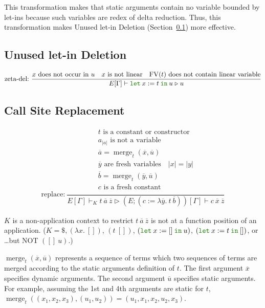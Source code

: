 \documentclass[a4paper,fleqn]{article}
\newcommand{\kwlet}{\mbox{\color{mygreen}\ttfamily let}}
\newcommand{\kwin}{\mbox{\color{mygreen}\ttfamily in}}
\newcommand{\lam}[2]{\lambda #1.\:#2}
\newcommand{\glodefB}[2]{(#1:=#2)}
\newcommand{\letin}[3]{\kwlet\:#1:=#2\:\kwin\:#3}
\DeclareMathOperator{\FV}{FV}
\DeclareMathOperator{\merg}{merge}
\newcommand{\secref}[1]{Section~\ref{#1}}
\newcommand{\reltri}{\mathrel{\triangleright}}
\newcommand{\rep}[1]{\overline{#1}}
\begin{document}
This transformation makes that static arguments contain no variable bounded by let-ins
because such variables are redex of delta reduction.
Thus, this transformation makes Unused let-in Deletion (\secref{sec:let-in-deletion}) more effective.

\subsection{Unused let-in Deletion}\label{sec:let-in-deletion}

\begin{gather*}
  \text{zeta-del:}~
    \dfrac{
      \text{$x$ does not occur in $u$} \quad \text{$x$ is not linear} \quad \text{$\FV(t)$ does not contain linear variable}
    }{E[\Gamma] \vdash \letin{x}{t}{u}
                       \reltri
                       u
    }
\end{gather*}

\subsection{Call Site Replacement}\label{sec:call-site-replacement}

\begin{gather*}
  \text{replace:}~
    \dfrac{
      \begin{gathered}
        \text{$t$ is a constant or constructor} \\
        \text{$a_{|a|}$ is not a variable} \\
        \rep{a} = \merg_t(\rep{x}, \rep{u}) \\
        \text{$\rep{y}$ are fresh variables} \quad
        |x| = |y| \\
        \rep{b} = \merg_t(\rep{y}, \rep{u}) \\
        \text{$c$ is a fresh constant} \\
      \end{gathered}
    }{E[\Gamma] \vdash_K t\:\rep{a}\:\rep{z}
      \reltri
      (E;\glodefB{c}{\lam{\rep{y}}{t\:\rep{b}}})[\Gamma] \vdash c\:\rep{x}\:\rep{z}
    }
\end{gather*}

$K$ is a non-application context to restrict $t\:\rep{a}\:\rep{z}$ is not at a function position of an application.
($K = \$, (\lam{x}{[]})$, $(t\:[])$, $(\letin{x}{[]}{u})$, $(\letin{x}{t}{[]})$, or \ldots but NOT $([]\:u)$.)

$\merg_t(\rep{x}, \rep{u})$ represents a sequence of terms which two sequences of terms are merged according to the static arguments definition of $t$.
The first argument $\rep{x}$ specifies dynamic arguments.
The second argument $\rep{u}$ specifies static arguments.
For example, assuming the 1st and 4th arguments are static for $t$, $\merg_t((x_1, x_2, x_3), (u_1, u_2)) = (u_1, x_1, x_2, u_2, x_3)$.
\end{document}
